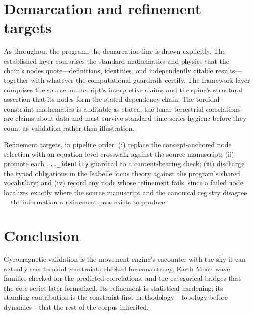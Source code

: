 \documentclass[11pt]{article}
\theoremstyle{remark}
\begin{document}
\section{Demarcation and refinement targets}
\label{sec:demarc}

As throughout the program, the demarcation line is drawn explicitly. The established layer comprises the standard mathematics and physics that the chain's nodes quote---definitions, identities, and independently citable results---together with whatever the computational guardrails certify. The framework layer comprises the source manuscript's interpretive claims and the spine's structural assertion that its nodes form the stated dependency chain. The toroidal-constraint mathematics is auditable as stated; the lunar-terrestrial correlations are claims about data and must survive standard time-series hygiene before they count as validation rather than illustration.

Refinement targets, in pipeline order: (i) replace the concept-anchored node selection with an equation-level crosswalk against the source manuscript; (ii) promote each \texttt{...\_identity} guardrail to a content-bearing check; (iii) discharge the typed obligations in the Isabelle focus theory against the program's shared vocabulary; and (iv) record any node whose refinement fails, since a failed node localizes exactly where the source manuscript and the canonical registry disagree---the information a refinement pass exists to produce.

\section{Conclusion}
\label{sec:conc}

Gyromagnetic validation is the movement engine's encounter with the sky it can actually see: toroidal constraints checked for consistency, Earth-Moon wave families checked for the predicted correlations, and the categorical bridges that the core series later formalized. Its refinement is statistical hardening; its standing contribution is the constraint-first methodology---topology before dynamics---that the rest of the corpus inherited.
\end{document}

